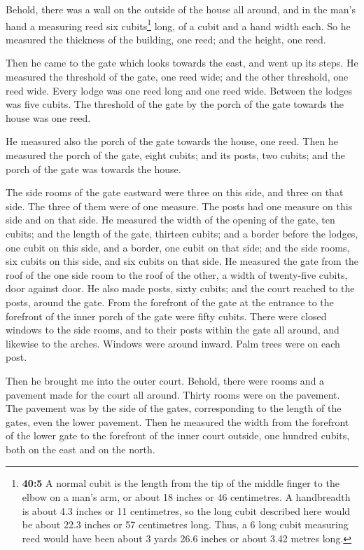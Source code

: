  Behold, there was a wall on the outside of the house all
around, and in the man's hand a measuring reed six cubits\footnote{\textbf{40:5}
  A normal cubit is the length from the tip of the middle finger to the
  elbow on a man's arm, or about 18 inches or 46 centimetres. A
  handbreadth is about 4.3 inches or 11 centimetres, so the long cubit
  described here would be about 22.3 inches or 57 centimetres long.
  Thus, a 6 long cubit measuring reed would have been about 3 yards 26.6
  inches or about 3.42 metres long.} long, of a cubit and a hand width
each. So he measured the thickness of the building, one reed; and the
height, one reed.

 Then he came to the gate which looks towards the east,
and went up its steps. He measured the threshold of the gate, one reed
wide; and the other threshold, one reed wide.  Every lodge
was one reed long and one reed wide. Between the lodges was five cubits.
The threshold of the gate by the porch of the gate towards the house was
one reed.

 He measured also the porch of the gate towards the house,
one reed.  Then he measured the porch of the gate, eight
cubits; and its posts, two cubits; and the porch of the gate was towards
the house.

 The side rooms of the gate eastward were three on this
side, and three on that side. The three of them were of one measure. The
posts had one measure on this side and on that side.  He
measured the width of the opening of the gate, ten cubits; and the
length of the gate, thirteen cubits;  and a border before
the lodges, one cubit on this side, and a border, one cubit on that
side; and the side rooms, six cubits on this side, and six cubits on
that side.  He measured the gate from the roof of the one
side room to the roof of the other, a width of twenty-five cubits, door
against door.  He also made posts, sixty cubits; and the
court reached to the posts, around the gate.  From the
forefront of the gate at the entrance to the forefront of the inner
porch of the gate were fifty cubits.  There were closed
windows to the side rooms, and to their posts within the gate all
around, and likewise to the arches. Windows were around inward. Palm
trees were on each post.

 Then he brought me into the outer court. Behold, there
were rooms and a pavement made for the court all around. Thirty rooms
were on the pavement.  The pavement was by the side of
the gates, corresponding to the length of the gates, even the lower
pavement.  Then he measured the width from the forefront
of the lower gate to the forefront of the inner court outside, one
hundred cubits, both on the east and on the north.

